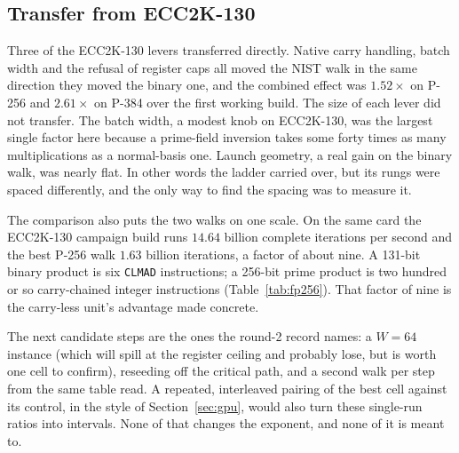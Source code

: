 \subsection{Transfer from ECC2K-130}
\label{sec:nist-lessons}

Three of the ECC2K-130 levers transferred directly. Native carry
handling, batch width and the refusal of register caps all moved the
NIST walk in the same direction they moved the binary one, and the
combined effect was $1.52\times$ on P-256 and $2.61\times$ on P-384 over
the first working build. The size of each lever did not transfer. The
batch width, a modest knob on ECC2K-130, was the largest single factor
here because a prime-field inversion takes some forty times as many
multiplications as a normal-basis one. Launch geometry, a real gain on the
binary walk, was nearly flat. In other words the ladder carried over,
but its rungs were spaced differently, and the only way to find the
spacing was to measure it.

The comparison also puts the two walks on one scale. On the same card
the ECC2K-130 campaign build runs $14.64$ billion complete iterations
per second and the best P-256 walk $1.63$ billion iterations, a factor of
about nine. A 131-bit binary product is six \texttt{CLMAD}
instructions; a 256-bit prime product is two hundred or so
carry-chained integer instructions (Table~\ref{tab:fp256}). That
factor of nine is the carry-less unit's advantage made concrete.

The next candidate steps are the ones the round-2 record names: a $W=64$
instance (which will spill at the register ceiling and probably lose,
but is worth one cell to confirm), reseeding off the critical path,
and a second walk per step from the same table read. A repeated,
interleaved pairing of the best cell against its control, in the
style of Section~\ref{sec:gpu}, would also turn these single-run
ratios into intervals. None of that changes the exponent, and none of
it is meant to.
